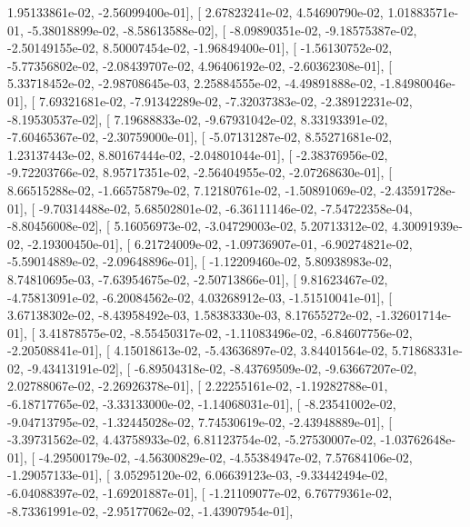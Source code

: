 \documentclass{article}
\begin{document}
          1.95133861e-02,  -2.56099400e-01],
       [  2.67823241e-02,   4.54690790e-02,   1.01883571e-01,
         -5.38018899e-02,  -8.58613588e-02],
       [ -8.09890351e-02,  -9.18575387e-02,  -2.50149155e-02,
          8.50007454e-02,  -1.96849400e-01],
       [ -1.56130752e-02,  -5.77356802e-02,  -2.08439707e-02,
          4.96406192e-02,  -2.60362308e-01],
       [  5.33718452e-02,  -2.98708645e-03,   2.25884555e-02,
         -4.49891888e-02,  -1.84980046e-01],
       [  7.69321681e-02,  -7.91342289e-02,  -7.32037383e-02,
         -2.38912231e-02,  -8.19530537e-02],
       [  7.19688833e-02,  -9.67931042e-02,   8.33193391e-02,
         -7.60465367e-02,  -2.30759000e-01],
       [ -5.07131287e-02,   8.55271681e-02,   1.23137443e-02,
          8.80167444e-02,  -2.04801044e-01],
       [ -2.38376956e-02,  -9.72203766e-02,   8.95717351e-02,
         -2.56404955e-02,  -2.07268630e-01],
       [  8.66515288e-02,  -1.66575879e-02,   7.12180761e-02,
         -1.50891069e-02,  -2.43591728e-01],
       [ -9.70314488e-02,   5.68502801e-02,  -6.36111146e-02,
         -7.54722358e-04,  -8.80456008e-02],
       [  5.16056973e-02,  -3.04729003e-02,   5.20713312e-02,
          4.30091939e-02,  -2.19300450e-01],
       [  6.21724009e-02,  -1.09736907e-01,  -6.90274821e-02,
         -5.59014889e-02,  -2.09648896e-01],
       [ -1.12209460e-02,   5.80938983e-02,   8.74810695e-03,
         -7.63954675e-02,  -2.50713866e-01],
       [  9.81623467e-02,  -4.75813091e-02,  -6.20084562e-02,
          4.03268912e-03,  -1.51510041e-01],
       [  3.67138302e-02,  -8.43958492e-03,   1.58383330e-03,
          8.17655272e-02,  -1.32601714e-01],
       [  3.41878575e-02,  -8.55450317e-02,  -1.11083496e-02,
         -6.84607756e-02,  -2.20508841e-01],
       [  4.15018613e-02,  -5.43636897e-02,   3.84401564e-02,
          5.71868331e-02,  -9.43413191e-02],
       [ -6.89504318e-02,  -8.43769509e-02,  -9.63667207e-02,
          2.02788067e-02,  -2.26926378e-01],
       [  2.22255161e-02,  -1.19282788e-01,  -6.18717765e-02,
         -3.33133000e-02,  -1.14068031e-01],
       [ -8.23541002e-02,  -9.04713795e-02,  -1.32445028e-02,
          7.74530619e-02,  -2.43948889e-01],
       [ -3.39731562e-02,   4.43758933e-02,   6.81123754e-02,
         -5.27530007e-02,  -1.03762648e-01],
       [ -4.29500179e-02,  -4.56300829e-02,  -4.55384947e-02,
          7.57684106e-02,  -1.29057133e-01],
       [  3.05295120e-02,   6.06639123e-03,  -9.33442494e-02,
         -6.04088397e-02,  -1.69201887e-01],
       [ -1.21109077e-02,   6.76779361e-02,  -8.73361991e-02,
         -2.95177062e-02,  -1.43907954e-01],
\end{document}
